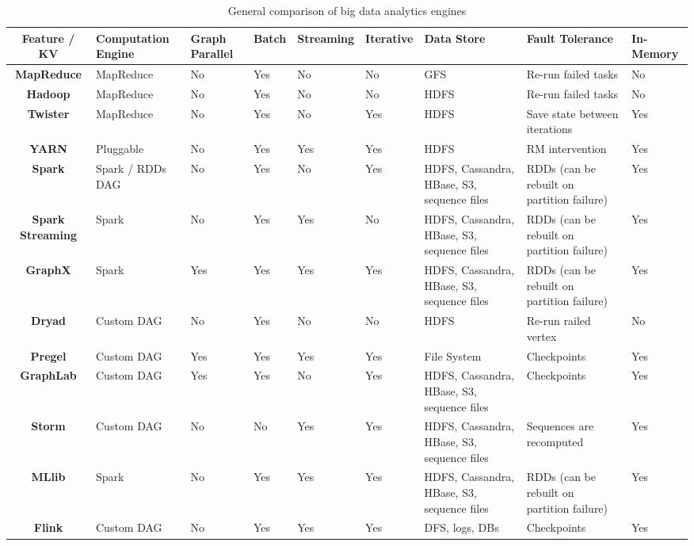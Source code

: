 \documentclass[]{article}
\begin{document}
\begin{table}
	\begin{adjustbox}{center} 
		\begin{tabulary}{1.7\linewidth}{|c|L|L|L|L|L|L|L|L|}
			\hline 
			\textbf{Feature / KV} & \textbf{Computation Engine} & \textbf{Graph Parallel} & \textbf{Batch} & \textbf{Streaming} & \textbf{Iterative} & \textbf{Data Store} &\textbf{Fault Tolerance} & \textbf{In-Memory}  \\
			\hline 
			\textbf{MapReduce} & MapReduce & No & Yes & No & No & GFS & Re-run failed tasks & No\\ 
			\hline 
			\textbf{Hadoop} & MapReduce & No & Yes & No & No & HDFS & Re-run failed tasks & No\\ 
			\hline 
			\textbf{Twister} & MapReduce & No & Yes & No & Yes & HDFS & Save state between iterations & Yes\\ 
			\hline 
			\textbf{YARN} & Pluggable & No & Yes & Yes & Yes & HDFS & RM intervention & Yes\\ 
			\hline 
			\textbf{Spark} & Spark / RDDs DAG & No & Yes & No & Yes & HDFS, Cassandra, HBase, S3, sequence files & RDDs (can be rebuilt on partition failure) & Yes\\ 
			\hline 
			\textbf{Spark Streaming} & Spark & No & Yes & Yes & No & HDFS, Cassandra, HBase, S3, sequence files & RDDs (can be rebuilt on partition failure) & Yes\\ 
			\hline 
			\textbf{GraphX} & Spark  & Yes & Yes & Yes & Yes &HDFS, Cassandra, HBase, S3, sequence files & RDDs (can be rebuilt on partition failure) & Yes \\ 
			\hline 
			\textbf{Dryad} & Custom DAG & No & Yes & No & No & HDFS & Re-run railed vertex & No\\ 
			\hline 
			\textbf{Pregel} & Custom DAG  & Yes & Yes & Yes & Yes & File System & Checkpoints & Yes\\ 
			\hline 
			\textbf{GraphLab} & Custom DAG & Yes & Yes & No & Yes & HDFS, Cassandra, HBase, S3, sequence files & Checkpoints & Yes\\ 
			\hline 
			\textbf{Storm} & Custom DAG & No & No & Yes & Yes & HDFS, Cassandra, HBase, S3, sequence files & Sequences are recomputed & Yes\\ 
			\hline 
			\textbf{MLlib} & Spark & No & Yes & Yes & Yes & HDFS, Cassandra, HBase, S3, sequence files & RDDs (can be rebuilt on partition failure) & Yes\\ 
			\hline 
			\textbf{Flink} & Custom DAG & No & Yes & Yes & Yes & DFS, logs, DBs & Checkpoints & Yes\\ 
			\hline 
		\end{tabulary} 
	\end{adjustbox}
	\caption{General comparison of big data analytics engines}
	\label{table:analytcs-comparison}
\end{table}
\end{document}
